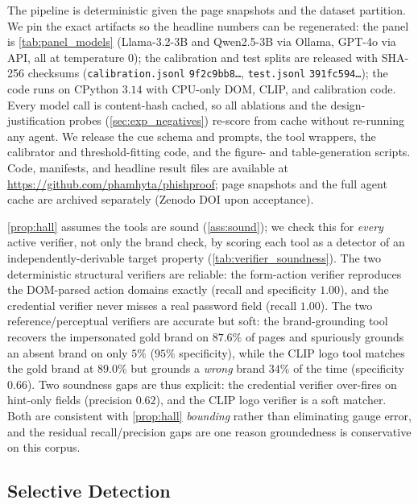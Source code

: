 The pipeline is deterministic given the page snapshots and the dataset partition. We pin the
exact artifacts so the headline numbers can be regenerated: the panel is
\autoref{tab:panel_models} (Llama-3.2-3B and Qwen2.5-3B via Ollama, GPT-4o via API, all at
temperature $0$); the calibration and test splits are released with SHA-256 checksums
(\texttt{calibration.jsonl} \texttt{9f2c9bb8\dots}, \texttt{test.jsonl} \texttt{391fc594\dots});
the code runs on CPython $3.14$ with CPU-only DOM, CLIP, and calibration code. Every model
call is content-hash cached, so all ablations and the design-justification probes
(\autoref{sec:exp_negatives}) re-score from cache without re-running any agent. We release
the cue schema and prompts, the tool wrappers, the calibrator and threshold-fitting code,
and the figure- and table-generation scripts. Code, manifests, and headline result files are
available at \url{https://github.com/phamhyta/phishproof}; page snapshots and the full agent
cache are archived separately (Zenodo DOI upon acceptance).

\autoref{prop:hall} assumes the tools are sound (\autoref{ass:sound}); we check this for
\emph{every} active verifier, not only the brand check, by scoring each tool as a detector of
an independently-derivable target property (\autoref{tab:verifier_soundness}). The two
deterministic structural verifiers are reliable: the form-action verifier reproduces the
DOM-parsed action domains exactly (recall and specificity $1.00$), and the credential
verifier never misses a real password field (recall $1.00$). The two reference/perceptual
verifiers are accurate but soft: the brand-grounding tool recovers the impersonated gold
brand on $87.6\%$ of pages and spuriously grounds an absent brand on only $5\%$ ($95\%$
specificity), while the CLIP logo tool matches the gold brand at $89.0\%$ but grounds a
\emph{wrong} brand $34\%$ of the time (specificity $0.66$). Two soundness gaps are thus
explicit: the credential verifier over-fires on hint-only fields (precision $0.62$), and the
CLIP logo verifier is a soft matcher. Both are consistent with \autoref{prop:hall}
\emph{bounding} rather than eliminating gauge error, and the residual recall/precision gaps
are one reason groundedness is conservative on this corpus.


\subsection{Selective Detection}
\label{sec:exp_rq1}

